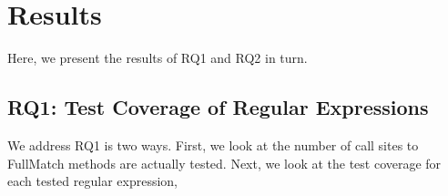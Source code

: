\section{Results}
\label{sec:results}

Here, we present the results of RQ1 and RQ2 in turn.


\subsection{RQ1: Test Coverage of Regular Expressions}
\label{sec:rq2}
\label{rq1:results}


We address RQ1 is two ways. First, we look at the number of call sites to FullMatch methods are actually tested. Next, we look at the test coverage for each tested regular expression, 

